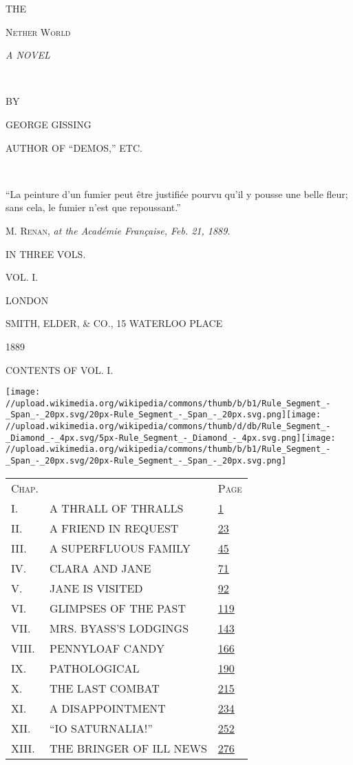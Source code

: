 {}

THE

{\textsc{Nether World}}

{\emph{A NOVEL}}

~

{BY}

{GEORGE GISSING}

{AUTHOR OF ``DEMOS,'' ETC.}

~

{``La peinture d'un fumier peut être justifiée pourvu qu'il y pousse une
belle fleur; sans cela, le fumier n'est que repoussant.'' }

\textsc{M. Renan}, \emph{at the Académie Française, Feb. 21, 1889}.

IN THREE VOLS.

VOL. I.

LONDON

SMITH, ELDER, \& CO., 15 WATERLOO PLACE

1889

{} {}

{CONTENTS OF VOL. I.}

\texttt{[image: //upload.wikimedia.org/wikipedia/commons/thumb/b/b1/Rule\_Segment\_-\_Span\_-\_20px.svg/20px-Rule\_Segment\_-\_Span\_-\_20px.svg.png]}\texttt{[image: //upload.wikimedia.org/wikipedia/commons/thumb/d/db/Rule\_Segment\_-\_Diamond\_-\_4px.svg/5px-Rule\_Segment\_-\_Diamond\_-\_4px.svg.png]}\texttt{[image: //upload.wikimedia.org/wikipedia/commons/thumb/b/b1/Rule\_Segment\_-\_Span\_-\_20px.svg/20px-Rule\_Segment\_-\_Span\_-\_20px.svg.png]}

\begin{longtable}[]{@{}lll@{}}
\toprule
\textsc{Chap.} & & \textsc{Page}\tabularnewline
I. & A THRALL OF THRALLS &
\href{/wiki/The_Nether_World/Volume_1/Chapter_1\#1}{1}\tabularnewline
II. & A FRIEND IN REQUEST &
\href{/wiki/The_Nether_World/Volume_1/Chapter_2\#23}{23}\tabularnewline
III. & A SUPERFLUOUS FAMILY &
\href{/wiki/The_Nether_World/Volume_1/Chapter_3\#45}{45}\tabularnewline
IV. & CLARA AND JANE &
\href{/wiki/The_Nether_World/Volume_1/Chapter_4\#71}{71}\tabularnewline
V. & JANE IS VISITED &
\href{/wiki/The_Nether_World/Volume_1/Chapter_5\#92}{92}\tabularnewline
VI. & GLIMPSES OF THE PAST &
\href{/wiki/The_Nether_World/Volume_1/Chapter_6\#119}{119}\tabularnewline
VII. & MRS. BYASS'S LODGINGS &
\href{/wiki/The_Nether_World/Volume_1/Chapter_7\#143}{143}\tabularnewline
VIII. & PENNYLOAF CANDY &
\href{/wiki/The_Nether_World/Volume_1/Chapter_8\#166}{166}\tabularnewline
IX. & PATHOLOGICAL &
\href{/wiki/The_Nether_World/Volume_1/Chapter_9\#190}{190}\tabularnewline
X. & THE LAST COMBAT &
\href{/wiki/The_Nether_World/Volume_1/Chapter_10\#215}{215}\tabularnewline
XI. & A DISAPPOINTMENT &
\href{/wiki/The_Nether_World/Volume_1/Chapter_11\#234}{234}\tabularnewline
XII. & ``IO SATURNALIA!'' &
\href{/wiki/The_Nether_World/Volume_1/Chapter_12\#252}{252}\tabularnewline
XIII. & THE BRINGER OF ILL NEWS &
\href{/wiki/The_Nether_World/Volume_1/Chapter_13\#276}{276}\tabularnewline
\bottomrule
\end{longtable}


